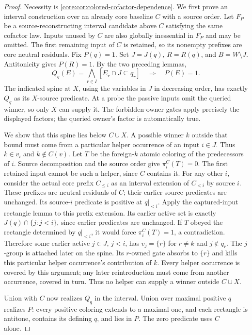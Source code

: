 \begin{proof}
Necessity is \cref{core:cor:colored-cofactor-dependence}.
We first prove an interval construction over an already core baseline $C$
with a source order. Let $F_P$ be a source-reconstructing interval candidate
above $C$ satisfying the same cofactor law. Inputs unused by $C$ are
also globally inessential in $F_P$ and may be omitted. The first remaining
input of $C$ is retained, so its nonempty prefixes are core neutral
residuals. Fix $P(q)=1$.
Set $J=J(q)$, $R=R(q)$, and $B=W\setminus J$.
Antitonicity gives $P(R)=1$. By the two preceding lemmas,
\[
 Q_q(E)=\bigwedge_{r\in I}[E_r\cap J\subseteq q_r]
 \quad\Longrightarrow\quad P(E)=1.
\]
The indicated spine at $X$, using the variables in $J$ in decreasing
order, has exactly $Q_q$ as its $X$-source predicate. At a probe the
passive inputs omit the queried winner, so only $X$ can supply it.
The forbidden-owner gates apply precisely the displayed factors; the
queried owner's factor is automatically true.

We show that this spine lies below $C\cup X$. A possible winner $k$
outside that bound must come from a particular helper occurrence of an
input $i\in J$. Thus $k\in v_i$ and $k\notin C(v)$.
Let $T$ be the foreign-$k$ atomic coloring of the predecessors of $i$.
Source decomposition and the source order give $\pi_i^C(T)=0$.
The first retained input cannot be such a helper, since $C$ contains it.
For any other $i$, consider the actual core prefix $C_{\leq i}$ as an
interval extension of $C_{<i}$ by source $i$. These prefixes are neutral
residuals of $C$; their earlier source predicates are unchanged.
Its source-$i$ predicate is positive at $q|_{<i}$.
Apply the captured-input rectangle lemma to this prefix extension.
Its earlier active set is exactly $J(q)\cap\{j:j<i\}$, since earlier
predicates are unchanged.
If $T$ obeyed the rectangle determined by $q|_{<i}$, it would force
$\pi_i^C(T)=1$, a contradiction. Therefore some earlier active
$j\in J$, $j<i$, has $v_j=\{r\}$ for $r\ne k$ and $j\notin q_r$.
The $j$-group is attached later on the spine. Its $r$-owned gate
absorbs to $\{r\}$ and kills this particular helper occurrence's
contribution of $k$. Every helper occurrence is covered by this argument;
any later reintroduction must come from another occurrence, covered in turn.
Thus no helper can supply a winner outside $C\cup X$.

Union with $C$ now realizes $Q_q$ in the interval. Union over maximal
positive $q$ realizes $P$: every positive coloring extends to a maximal
one, and each rectangle is antitone, contains its defining $q$, and lies
in $P$. The zero predicate uses $C$ alone.


\end{proof}
